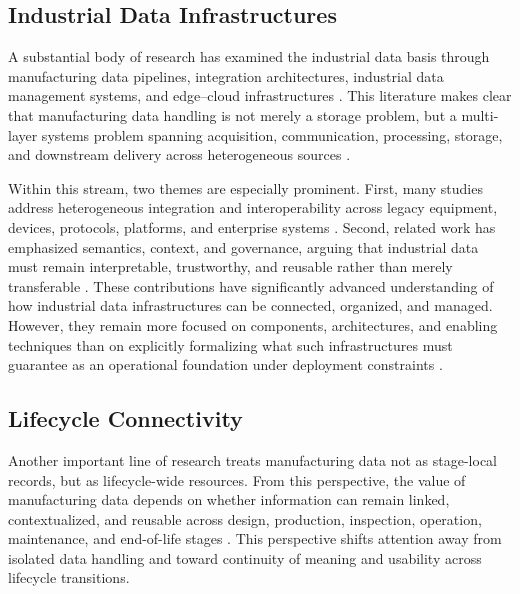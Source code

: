 \documentclass[systems,article,submit,pdftex,moreauthors]{Definitions/mdpi}
\begin{document}
\subsection{Industrial Data Infrastructures}
\label{sec:industrial_data_infrastructures}

A substantial body of research has examined the industrial data basis through manufacturing data pipelines, integration architectures, industrial data management systems, and edge--cloud infrastructures \cite{ismail2019manufacturing, raptis2019data, saqlain2019framework}. This literature makes clear that manufacturing data handling is not merely a storage problem, but a multi-layer systems problem spanning acquisition, communication, processing, storage, and downstream delivery across heterogeneous sources \cite{ismail2019manufacturing, odonovan2015industrial}.

Within this stream, two themes are especially prominent. First, many studies address heterogeneous integration and interoperability across legacy equipment, devices, protocols, platforms, and enterprise systems \cite{zeid2019interoperability, pereira2021towards, modoni2017enhancing}. Second, related work has emphasized semantics, context, and governance, arguing that industrial data must remain interpretable, trustworthy, and reusable rather than merely transferable \cite{hildebrandt2020ontology, morris2020foundations, westermann2022accessing}. These contributions have significantly advanced understanding of how industrial data infrastructures can be connected, organized, and managed. However, they remain more focused on components, architectures, and enabling techniques than on explicitly formalizing what such infrastructures must guarantee as an operational foundation under deployment constraints \cite{ismail2019manufacturing, raptis2019data, morris2020foundations}.

\subsection{Lifecycle Connectivity}
\label{sec:lifecycle_connectivity}

Another important line of research treats manufacturing data not as stage-local records, but as lifecycle-wide resources. From this perspective, the value of manufacturing data depends on whether information can remain linked, contextualized, and reusable across design, production, inspection, operation, maintenance, and end-of-life stages \cite{ren2019bigdata, tao2018datadriven, bernstein2018contextualising, hedberg2017lift}. This perspective shifts attention away from isolated data handling and toward continuity of meaning and usability across lifecycle transitions.
\end{document}
